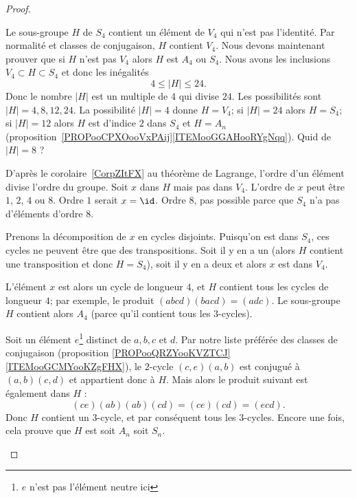 \begin{proof}
\begin{subproof}
\begin{subproof}
			\spitem[Si \( n=4\)]

			Le sous-groupe \( H\) de \( S_4\) contient un élément de \( V_4\) qui n'est pas l'identité. Par normalité et classes de conjugaison, \( H\) contient \( V_4\). Nous devons maintenant prouver que si \( H\) n'est pas \( V_4\) alors \( H\) est \( A_4\) ou \( S_4\). Nous avons les inclusions \( V_4\subset H\subset S_4\) et donc les inégalités
			\begin{equation}
				4\leq | H |\leq 24.
			\end{equation}
			Donc le nombre \( | H |\) est un multiple de \( 4\) qui divise \( 24\). Les possibilités sont \( | H |=4,8,12,24\). La possibilité \( | H |=4\) donne \( H=V_4\); si \( |H |=24\) alors \( H=S_4\); si \( | H |=12\) alors \( H\) est d'indice \( 2\) dans \( S_4\) et \( H=A_n\) (proposition~\ref{PROPooCPXOooVxPAij}\ref{ITEMooGGAHooRYgNqq}). Quid de \( | H |=8\) ?

			D'après le corolaire~\ref{CorpZItFX} au théorème de Lagrange, l'ordre d'un élément divise l'ordre du groupe. Soit \( x\) dans \( H\) mais pas dans \( V_4\). L'ordre de \( x\) peut être \( 1\), \( 2\), \( 4\) ou \( 8\). Ordre \( 1\) serait \( x=\id\). Ordre \( 8\), pas possible parce que \( S_4\) n'a pas d'éléments d'ordre \( 8\).
			\begin{subproof}
				\spitem[\( x\) d'ordre \( 2\)]

				Prenons la décomposition de \( x\) en cycles disjoints. Puisqu'on est dans \( S_4\), ces cycles ne peuvent être que des transpositions. Soit il y en a un (alors \( H\) contient une transposition et donc \( H=S_4\)), soit il y en a deux et alors \( x\) est dans \( V_4\).

				\spitem[\( x\) d'ordre \( 4\)]

				L'élément \( x\) est alors un cycle de longueur \( 4\), et \( H\) contient tous les cycles de longueur \( 4\); par exemple, le produit \( (abcd)(bacd)=(adc)\). Le sous-groupe \( H\) contient alors \( A_4\) (parce qu'il contient tous les \( 3\)-cycles).
			\end{subproof}

			\spitem[Si \( n\geq 5\)]

			Soit un élément \( e\)\footnote{\( e\) n'est pas l'élément neutre ici} distinct de \( a,b,c\) et \( d\). Par notre liste préférée des classes de conjugaison (proposition \ref{PROPooQRZYooKVZTCJ}\ref{ITEMooGCMYooKZgFHX}), le \( 2\)-cycle \( (c,e)(a,b)\) est conjugué à \( (a,b)(c,d)\) et appartient donc à \( H\). Mais alors le produit suivant est également dans \( H\) :
			\begin{equation}
				(ce)(ab)(ab)(cd)=(ce)(cd)=(ecd).
			\end{equation}
			Donc \( H\) contient un \( 3\)-cycle, et par conséquent tous les \( 3\)-cycles. Encore une fois, cela prouve que \( H\) est soit \( A_n\) soit \( S_n\).


\end{subproof}
\end{subproof}
\end{proof}
